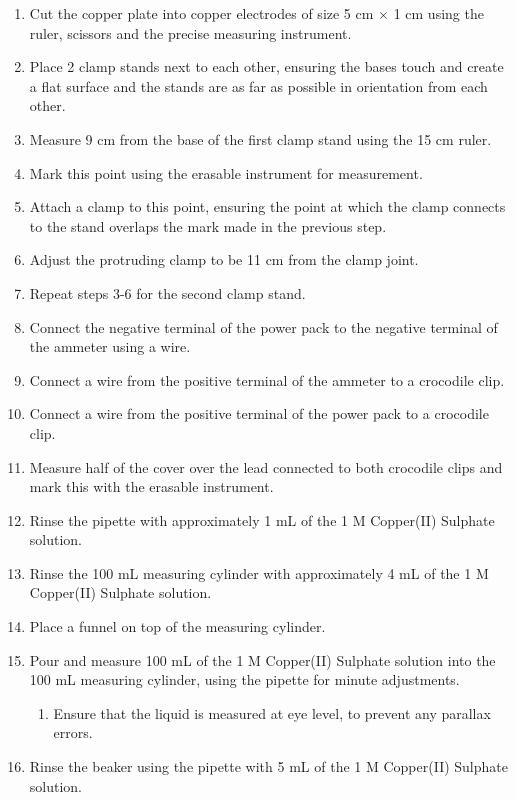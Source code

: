 \documentclass[11pt, a4]{article}
\begin{document}
			\begin{enumerate}
				\item Cut the copper plate into copper electrodes of size 5 cm $\times$ 1 cm using the ruler, scissors and the precise measuring instrument.
				\item Place 2 clamp stands next to each other, ensuring the bases touch and create a flat surface and the stands are as far as possible in orientation from each other.
				\item Measure 9 cm from the base of the first clamp stand using the 15 cm ruler.
				\item Mark this point using the erasable instrument for measurement.
				\item Attach a clamp to this point, ensuring the point at which the clamp connects to the stand overlaps the mark made in the previous step.
				\item Adjust the protruding clamp to be 11 cm from the clamp joint.
				\item Repeat steps 3-6 for the second clamp stand.
				\item Connect the negative terminal of the power pack to the negative terminal of the ammeter using a wire.
				\item Connect a wire from the positive terminal of the ammeter to a crocodile clip.
				\item Connect a wire from the positive terminal of the power pack to a crocodile clip.
				\item Measure half of the cover over the lead connected to both crocodile clips and mark this with the erasable instrument.
				\item Rinse the pipette with approximately 1 mL of the 1 M Copper(II) Sulphate solution.
				\item Rinse the 100 mL measuring cylinder with approximately 4 mL of the 1 M Copper(II) Sulphate solution.
				\item Place a funnel on top of the measuring cylinder.
				\item Pour and measure 100 mL of the 1 M Copper(II) Sulphate solution into the 100 mL measuring cylinder, using the pipette for minute adjustments.
				\begin{enumerate}
					\item Ensure that the liquid is measured at eye level, to prevent any parallax errors.
				\end{enumerate}
				\item Rinse the beaker using the pipette with 5 mL of the 1 M Copper(II) Sulphate solution.

\end{enumerate}
\end{document}
